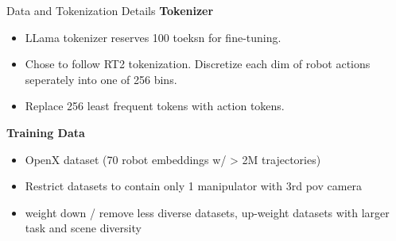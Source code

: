 \documentclass{beamer}
\begin{document}
\begin{frame}[t]{Data and Tokenization Details}
    \textbf{Tokenizer}
    \begin{itemize}[label=-]
        \item LLama tokenizer reserves 100 toeksn for fine-tuning.
        \item Chose to follow RT2 tokenization. Discretize each dim of robot actions seperately into one of 256 bins.
        \item Replace 256 least frequent tokens with action tokens.
    \end{itemize}
    \textbf{Training Data}
    \begin{itemize}[label=-]
        \item OpenX dataset (70 robot embeddings w/ > 2M trajectories)
        \item Restrict datasets to contain only 1 manipulator with 3rd pov camera
        \item weight down / remove less diverse datasets, up-weight datasets with larger task and scene diversity
    \end{itemize}
\end{frame}
\end{document}
